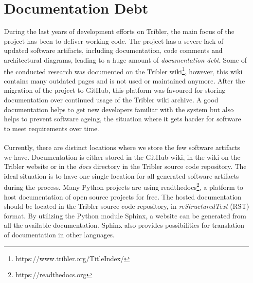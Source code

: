 
\section{Documentation Debt}
\label{sec:software-artifacts}
During the last years of development efforts on Tribler, the main focus of the project has been to deliver working code. The project has a severe lack of updated software artifacts, including documentation, code comments and architectural diagrams, leading to a huge amount of \emph{documentation debt}. Some of the conducted research was documented on the Tribler wiki\footnote{https://www.tribler.org/TitleIndex/}, however, this wiki contains many outdated pages and is not used or maintained anymore. After the migration of the project to GitHub, this platform was favoured for storing documentation over continued usage of the Tribler wiki archive. A good documentation helps to get new developers familiar with the system but also helps to prevent software ageing\cite{parnas1994software}, the situation where it gets harder for software to meet requirements over time.\\\\
Currently, there are distinct locations where we store the few software artifacts we have. Documentation is either stored in the GitHub wiki, in the wiki on the Tribler website or in the \emph{docs} directory in the Tribler source code repository. The ideal situation is to have one single location for all generated software artifacts during the process. Many Python projects are using readthedocs\footnote{https://readthedocs.org}, a platform to host documentation of open source projects for free. The hosted documentation should be located in the Tribler source code repository, in \emph{reStructuredText} (RST) format. By utilizing the Python module Sphinx, a website can be generated from all the available documentation. Sphinx also provides possibilities for translation of documentation in other languages.\\

